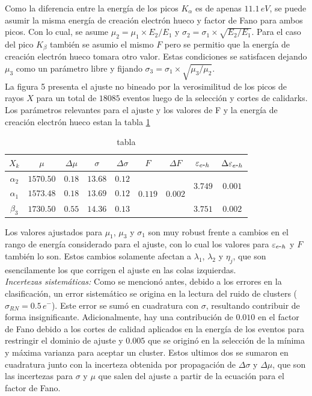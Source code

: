 \indent Como la diferencia entre la energía de los picos $K_{\alpha}$ es de apenas $11.1\,\si{eV}$, se puede asumir la misma energía de creación electrón hueco y factor de Fano para ambos picos. Con lo cual, se asume $\mu_{2} = \mu_{1} \times E_{2}/E_{1}$ y $\sigma_{2} = \sigma_{1}\times \sqrt{E_{2}/E_{1}}$. Para el caso del pico $K_{\beta}$ también se asumio el mismo $F$ pero se permitio que la energía de creación electrón hueco tomara otro valor. Estas condiciones se satisfacen dejando $\mu_{3}$ como un parámetro libre y fijando $\sigma_{3} = \sigma_{1}\times \sqrt{\mu_{3}/\mu_{2}}$.\\
\indent La figura 5 presenta el ajuste no bineado por la verosimilitud de los picos de rayos $X$ para un total de $18085$ eventos luego de la selección y cortes de calidarks. Los parámetros relevantes para el ajuste y los valores de F y la energía de creación electrón hueco estan la tabla \ref{tab:ParametrosAjusteNoBineado}

\begin{table}[]
\centering
\begin{tabular}{@{}ccccccccc@{}}
\toprule
$X_{k}$ &
  $\mu$ &
  $\Delta \mu$ &
  $\sigma$ &
  $\Delta \sigma$ &
  $F$ &
  $\Delta F$ &
  $\varepsilon_{e\mbox{-}h}$ &
  $\Delta \varepsilon_{e\mbox{-}h}$ \\ \hline\hline
$\alpha_{2}$ &
  $1570.50$ &
  $0.18$ &
  $13.68$ &
  $0.12$ &
  \multirow{3}{*}{$0.119$} &
  \multirow{3}{*}{$0.002$} &
  \multirow{2}{*}{$3.749$} &
  \multirow{2}{*}{$0.001$} \\
$\alpha_{1}$ & $1573.48$ & $0.18$ & $13.69$ & $0.12$ &  &  &         &         \\
$\beta_{3}$  & $1730.50$ & $0.55$ & $14.36$ & $0.13$ &  &  & $3.751$ & $0.002$ \\ \bottomrule
\end{tabular}
\caption{tabla}
\label{tab:ParametrosAjusteNoBineado}
\end{table}
Los valores ajustados para $\mu_{1}$, $\mu_{3}$ y $\sigma_{1}$ son muy robust frente a cambios en el rango de energía considerado para el ajuste, con lo cual los valores para $\varepsilon_{e\mbox{-}h}$ y $F$ también lo son. Estos cambios solamente afectan a $\lambda_{1}$, $\lambda_{2}$ y $\eta_{j}$, que son esencilamente los que corrigen el ajuste en las colas izquierdas.\\
\indent \textit{Incertezas sistemáticas:} Como se mencionó antes, debido a los errores en la clasificación, un error sistemático se origina en la lectura del ruido de clusters ($\sigma_{RN} =0.5\,e^{-}$). Este error se sumó en cuadratura con $\sigma$, resultando contribuir de forma insignificante. Adicionalmente, hay una contribución de $0.010$ en el factor de Fano debido a los cortes de calidad aplicados en la energía de los eventos para restringir el dominio de ajuste y $0.005$ que se originó en la selección de la mínima y máxima varianza para aceptar un cluster. Estos ultimos dos se sumaron en cuadratura junto con la incerteza obtenida por propagación de $\Delta \sigma$ y $\Delta \mu$, que son las incertezas para $\sigma$ y $\mu$ que salen del ajuste a partir de la ecuación para el factor de Fano.

